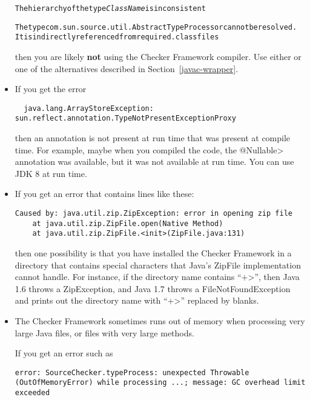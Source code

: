 \begin{itemize}
\begin{alltt}
The hierarchy of the type \emph{ClassName} is inconsistent

The type com.sun.source.util.AbstractTypeProcessor cannot be resolved.
  It is indirectly referenced from required .class files
\end{alltt}

\begin{sloppypar}
\noindent
then you are likely \textbf{not} using the Checker Framework compiler.  Use
either  or one of the alternatives
described in Section~\ref{javac-wrapper}.
\end{sloppypar}


\item
If you get the error

\begin{Verbatim}
  java.lang.ArrayStoreException: sun.reflect.annotation.TypeNotPresentExceptionProxy
\end{Verbatim}

\noindent
then an annotation is not present at run time that was present at compile
time.  For example, maybe when you compiled the code, the \<@Nullable>
annotation was available, but it was not available at run time.
You can use JDK 8 at run time.

\item
If you get an error that contains lines like these:

\begin{Verbatim}
Caused by: java.util.zip.ZipException: error in opening zip file
    at java.util.zip.ZipFile.open(Native Method)
    at java.util.zip.ZipFile.<init>(ZipFile.java:131)
\end{Verbatim}

\noindent
then one possibility is that you have installed the Checker Framework in a
directory that contains special characters that Java's ZipFile
implementation cannot handle.  For instance, if the directory name contains
``\<+>'', then Java 1.6 throws a ZipException, and Java 1.7 throws a
FileNotFoundException and prints out the directory name with ``\<+>''
replaced by blanks.

\item
The Checker Framework sometimes runs out of memory when processing very
large Java files, or files with very large methods.

If you get an error such as
\begin{Verbatim}
error: SourceChecker.typeProcess: unexpected Throwable (OutOfMemoryError) while processing ...; message: GC overhead limit exceeded
\end{Verbatim}


\end{itemize}
